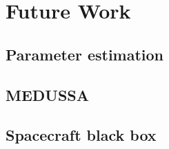 
\chapter{Future Work}
\label{ch.FutureWork}

\section{Parameter estimation}

\section{MEDUSSA}

\section{Spacecraft black box}
